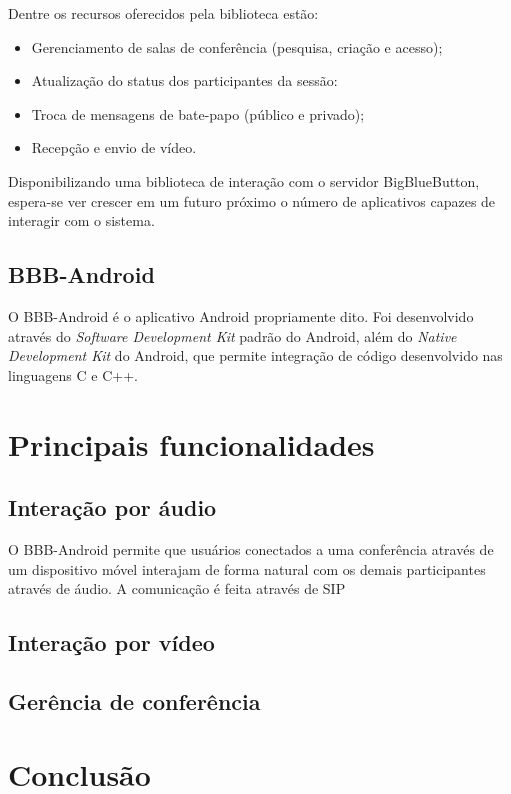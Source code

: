 \documentclass{acm_proc_article-sp}
\begin{document}
Dentre os recursos oferecidos pela biblioteca estão:
\begin{itemize}
 \item Gerenciamento de salas de conferência (pesquisa, criação e acesso);
 \item Atualização do status dos participantes da sessão:
 \item Troca de mensagens de bate-papo (público e privado);
 \item Recepção e envio de vídeo.
\end{itemize}

Disponibilizando uma biblioteca de interação com o servidor BigBlueButton, espera-se ver crescer em um futuro próximo o número de aplicativos capazes de interagir com o sistema.

\subsection{BBB-Android}

O BBB-Android é o aplicativo Android propriamente dito. Foi desenvolvido através do \emph{Software Development Kit} padrão do Android, além do \emph{Native Development Kit} do Android, que permite integração de código desenvolvido nas linguagens C e C++.

\section{Principais funcionalidades}

\subsection{Interação por áudio}

O BBB-Android permite que usuários conectados a uma conferência através de um dispositivo móvel interajam de forma natural com os demais participantes através de áudio. A comunicação é feita através de SIP

\subsection{Interação por vídeo}
\subsection{Gerência de conferência}

\section{Conclusão}~\cite{roesler_iva}

%

%
%
\balancecolumns
\end{document}
